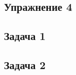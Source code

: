 \documentclass[a4paper, 12pt]{article}
\begin{document}
\subsection*{Упражнение 4}
\lipsum[7-8]

\subsection*{Задача 1}
\lipsum[9-10]

\subsection*{Задача 2}
\lipsum[11-12]
\end{document}
